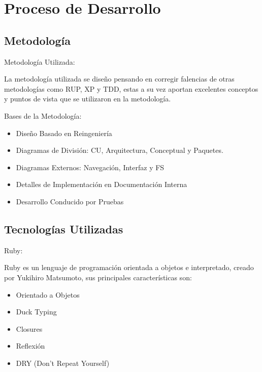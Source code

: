 \section{Proceso de Desarrollo}


\subsection{Metodología}

\begin{frame}{Metodología Utilizada:\newline}

La metodología utilizada se diseño pensando en corregir falencias de otras metodologías como RUP, XP y TDD, estas a su vez aportan excelentes conceptos y puntos de vista que se utilizaron en la metodología.

\end{frame}

\begin{frame}{Bases de la Metodología:\newline}

\begin{itemize}
	
	\pause \item Diseño Basado en Reingeniería
	\pause \item Diagramas de División: CU, Arquitectura, Conceptual y Paquetes.
	\pause \item Diagramas Externos: Navegación, Interfaz y FS
	\pause \item Detalles de Implementación en Documentación Interna
	\pause \item Desarrollo Conducido por Pruebas
	
\end{itemize}

\end{frame}


\subsection{Tecnologías Utilizadas}

\begin{frame}{Ruby:\newline}

Ruby es un lenguaje de programación orientada a objetos e interpretado, creado por Yukihiro Matsumoto, sus principales características son:\newline

\begin{itemize}
	
	\pause \item Orientado a Objetos
	\pause \item Duck Typing
	\pause \item Closures
	\pause \item Reflexión
	\pause \item DRY (Don't Repeat Yourself)
	
\end{itemize}

\end{frame}

